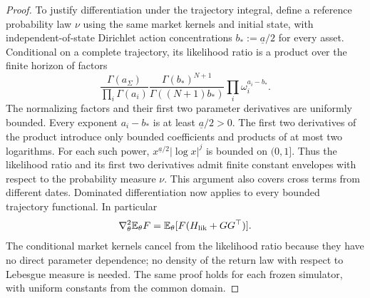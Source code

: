 \documentclass[11pt]{article}
\newcommand{\E}{\mathbb E}
\newcommand{\1}{\mathbf 1}
\begin{document}
\begin{proof}
To justify differentiation under the trajectory integral, define a reference probability law $\nu$ using the same market kernels and initial state, with independent-of-state Dirichlet action concentrations $b_*:=\underline a/2$ for every asset. Conditional on a complete trajectory, its likelihood ratio is a product over the finite horizon of factors
\[
 \frac{\Gamma(a_\Sigma)}{\prod_i\Gamma(a_i)}
 \frac{\Gamma(b_*)^{N+1}}{\Gamma((N+1)b_*)}
 \prod_i\omega_i^{a_i-b_*}.
\]
The normalizing factors and their first two parameter derivatives are uniformly bounded. Every exponent $a_i-b_*$ is at least $\underline a/2>0$. The first two derivatives of the product introduce only bounded coefficients and products of at most two logarithms. For each such power, $x^{\underline a/2}|\log x|^j$ is bounded on $(0,1]$. Thus the likelihood ratio and its first two derivatives admit finite constant envelopes with respect to the probability measure $\nu$. This argument also covers cross terms from different dates. Dominated differentiation now applies to every bounded trajectory functional. In particular
\begin{equation}\label{eq:second-likelihood-interface}
 \nabla_\theta^2\E_\theta F
 =\E_\theta[F(H_{\rm lik}+GG^\top)].
\end{equation}
The conditional market kernels cancel from the likelihood ratio because they have no direct parameter dependence; no density of the return law with respect to Lebesgue measure is needed. The same proof holds for each frozen simulator, with uniform constants from the common domain.
\end{proof}
\end{document}
